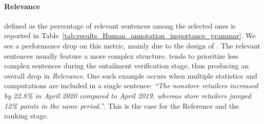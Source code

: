 \paragraph{Relevance} defined as the percentage of relevant sentences among the selected ones is reported in Table~\ref{tab:results_Human_annotation_importance_grammar}. We see a performance drop on this metric, mainly due to the design of \metric. The relevant sentences usually feature a more complex structure. \metric{} tends to prioritize less complex sentences during the entailment verification stage, thus producing an overall drop in \emph{Relevance}. 
One such example occurs when multiple statistics and computations are included in a single sentence: \emph{``The nonstore retailers increased by 22.8\% in April 2020 compared to April 2019, whereas store retailers jumped 12\% points in the same period.''}.
This is the case for the Reference and the \pipeline ranking stage.

\begin{table}[!ht]
\centering
{}
\caption{
Human annotation rates for grammaticality and relevance computed on non dropped sentences.
\emph{Grammaticality} (Gram.) is the \% of grammatically correct sentences; \emph{Grammaticality ($S$)} the \% of fully grammatically correct summaries; \emph{Relevance} the percentage of relevant sentences.
We report the reference, and different \pipeline{} stages using PALM-2. \metric{} provides general improvements in sentence level grammaticality, whereas the performance on relevance and summary level grammaticality are mixed, due to \metric{} design.
}
\label{tab:results_Human_annotation_importance_grammar} 
\vspace{-2ex}
\end{table}

